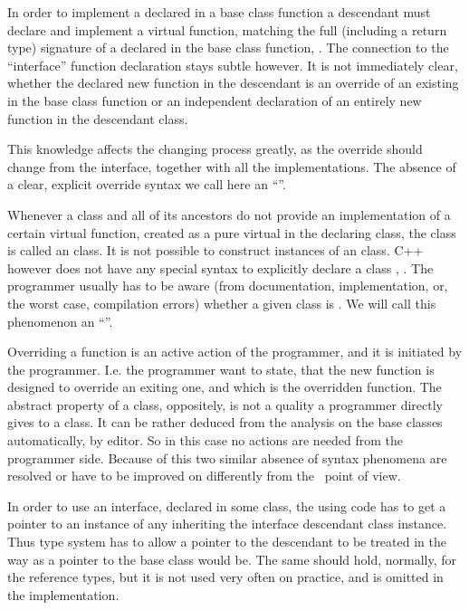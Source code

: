 In order to implement a declared in a base class function a descendant must declare and implement
a virtual function, matching the full (including a return type) signature of a declared in the base class function, . 
The connection to the ``interface'' function declaration stays subtle however. It is not immediately clear, whether the 
declared new function in the descendant is an override of an existing in the base class function or an independent declaration
of an entirely new function in the descendant class. 

This knowledge affects the changing process greatly, as the override should change from the interface, 
together with all the implementations. The absence of a clear, explicit override syntax we call here an ``''.

Whenever a class and all of its ancestors do not provide an implementation of a certain virtual function,
created as a pure virtual in the declaring class, the class is called an  class. It is not possible
to construct instances of an  class. C++ however does not have any special syntax to explicitly declare a 
class ,  .
The programmer usually has to be aware (from documentation, implementation, or, the worst case, compilation
errors) whether a given class is . We will call this phenomenon an ``''.

Overriding a function is an active action of the programmer, and it is initiated by the 
programmer. I.e. the programmer want to state, that the new function is designed to override an exiting one, and 
which is the overridden function. The abstract property of a class, oppositely, is not a quality a programmer directly
gives to a class. It can be rather deduced from the analysis on the base classes automatically, by editor. So in this case
no actions are needed from the programmer side. Because of this two similar absence of syntax phenomena are resolved or
have to be improved on differently from the \pcpp\ point of view.

In order to use an interface, declared in some class, the using code has to get a pointer to an instance
of any inheriting the interface descendant class instance. Thus type system has to allow a pointer
to the descendant to be treated in the way as a pointer to the base class would be. The same should hold, 
normally, for the reference types, but it is not used very often on practice, and is omitted in the implementation.

